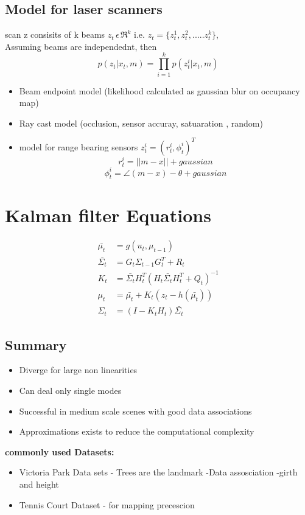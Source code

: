 \documentclass{article}
\begin{document}
 \subsection{Model for laser scanners}
 scan z consisits of k beams $z_t \,\epsilon \, \Re^{k}$ i.e. 
 $z_t = \{z_t^1,z_t^2,.....z_t^k\}$,\\ Assuming 
 beams are independednt, then $$p(z_t|x_t,m) = \prod_{i = 1}^{k} p(z_t^i|x_t,m)$$
 \begin{itemize}
     \item Beam endpoint model (likelihood calculated as gaussian blur on occupancy map)
     \item Ray cast model (occlusion, sensor accuray, satuaration , random)
     \item model for range bearing sensors $z_t^i  = (r_t^i,\phi_t^i)^T$
        $$r_t^i = ||m-x|| + gaussian$$
        $$\phi_t^i = \angle (m-x) - \theta + gaussian$$


 \end{itemize}

\section{Kalman filter Equations}
\begin{align*}
    \bar{\mu_t} & = g(u_t,\mu_{t-1})\\
    \bar{\Sigma_t} & = G_t \Sigma_{t-1} G_t^T + R_t\\
    K_t & = \bar{\Sigma_t}H_t^T(H_t\bar{\Sigma_t}H_t^T + Q_t)^{-1}\\
    \mu_t & = \bar{\mu_t} + K_t(z_t - h(\bar{\mu_t}))\\
    \Sigma_t & = (I - K_tH_t)\bar{\Sigma_t}
\end{align*}
\subsection{Summary}
\begin{itemize}
    \item Diverge for large non linearities 
    \item Can deal only single modes 
    \item Successful in medium scale scenes with good data associations
    \item Approximations exists to reduce the computational complexity
\end{itemize}
\textbf{commonly used Datasets:}
\begin{itemize}
    \item Victoria Park Data sets - Trees are the landmark -Data assosciation -girth and height
    \item Tennis Court Dataset - for mapping precescion
\end{itemize}
\end{document}
